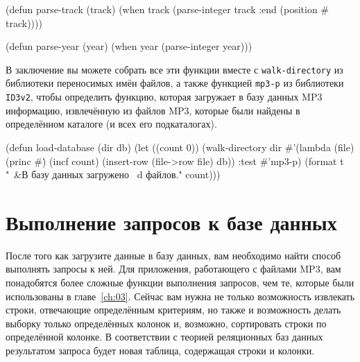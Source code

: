 \begin{myverb}
(defun parse-track (track)
  (when track (parse-integer track :end (position #\/ track))))

(defun parse-year (year)
  (when year (parse-integer year)))
\end{myverb}

В заключение вы можете собрать все эти функции вместе с \lstinline{walk-directory} из
библиотеки переносимых имён файлов, а также функцией \lstinline{mp3-p} из библиотеки
\lstinline{ID3v2}, чтобы определить функцию, которая загружает в базу данных MP3 информацию,
извлечённую из файлов MP3, которые были найдены в определённом каталоге (и всех его
подкаталогах).

\begin{myverb}
(defun load-database (dir db)
  (let ((count 0))
    (walk-directory 
     dir 
     #'(lambda (file)
         (princ #\.)
         (incf count)
         (insert-row (file->row file) db))
     :test #'mp3-p)
    (format t "~&В базу данных загружено ~d файлов." count)))
\end{myverb}

\section{Выполнение запросов к базе данных}

После того как загрузите данные в базу данных, вам необходимо найти способ выполнять
запросы к ней.  Для приложения, работающего с файлами MP3, вам понадобятся более сложные
функции выполнения запросов, чем те, которые были использованы в главе~\ref{ch:03}.  Сейчас
вам нужна не только возможность извлекать строки, отвечающие определённым критериям, но
также и возможность делать выборку только определённых колонок и, возможно, сортировать
строки по определённой колонке.  В соответствии с теорией реляционных баз данных
результатом запроса будет новая таблица, содержащая строки и колонки.

